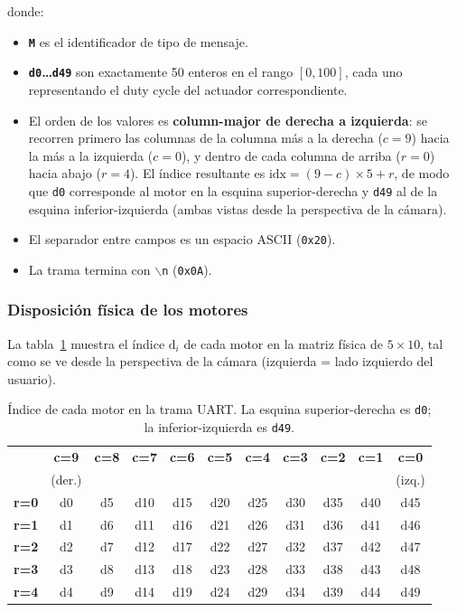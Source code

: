 donde:
\begin{itemize}
  \item \textbf{\texttt{M}} es el identificador de tipo de mensaje.
  \item \textbf{\texttt{d0}\ldots\texttt{d49}} son exactamente 50 enteros en
        el rango $[0, 100]$, cada uno representando el duty cycle del
        actuador correspondiente.
  \item El orden de los valores es \textbf{column-major de derecha a
        izquierda}: se recorren primero las columnas de la columna más a la
        derecha ($c = 9$) hacia la más a la izquierda ($c = 0$), y dentro
        de cada columna de arriba ($r = 0$) hacia abajo ($r = 4$). El índice
        resultante es
        $\text{idx} = (9 - c) \times 5 + r$,
        de modo que \texttt{d0} corresponde al motor en la esquina
        superior-derecha y \texttt{d49} al de la esquina inferior-izquierda
        (ambas vistas desde la perspectiva de la cámara).
  \item El separador entre campos es un espacio ASCII (\texttt{0x20}).
  \item La trama termina con \texttt{$\backslash$n} (\texttt{0x0A}).
\end{itemize}

\subsubsection{Disposición física de los motores}

La tabla~\ref{tab:motor-layout} muestra el índice $\text{d}_i$ de cada
motor en la matriz física de $5 \times 10$, tal como se ve desde la
perspectiva de la cámara (izquierda = lado izquierdo del usuario).

\begin{table}[H]
\centering
\begin{tabular}{c|cccccccccc}
\toprule
 & \textbf{c=9} & \textbf{c=8} & \textbf{c=7} & \textbf{c=6} & \textbf{c=5}
 & \textbf{c=4} & \textbf{c=3} & \textbf{c=2} & \textbf{c=1} & \textbf{c=0} \\
 & (der.) & & & & & & & & & (izq.) \\
\midrule
\textbf{r=0} & d0  & d5  & d10 & d15 & d20 & d25 & d30 & d35 & d40 & d45 \\
\textbf{r=1} & d1  & d6  & d11 & d16 & d21 & d26 & d31 & d36 & d41 & d46 \\
\textbf{r=2} & d2  & d7  & d12 & d17 & d22 & d27 & d32 & d37 & d42 & d47 \\
\textbf{r=3} & d3  & d8  & d13 & d18 & d23 & d28 & d33 & d38 & d43 & d48 \\
\textbf{r=4} & d4  & d9  & d14 & d19 & d24 & d29 & d34 & d39 & d44 & d49 \\
\bottomrule
\end{tabular}
\caption{Índice de cada motor en la trama UART. La esquina
  superior-derecha es \texttt{d0}; la inferior-izquierda es \texttt{d49}.}
\label{tab:motor-layout}
\end{table}

